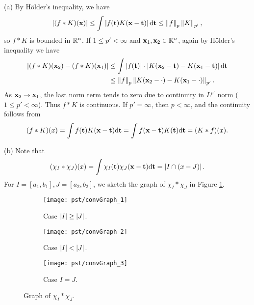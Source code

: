 \begin{exercise}{9.3}
  (a) By H\"{o}lder's inequality, we have
  \[
    \left| (f*K)(\mathbf{x}) \right|
    \le \int \left| f(\mathbf{t}) K(\mathbf{x} - \mathbf{t}) \right| \mathrm{d} \mathbf{t}
    \le \left\| f \right\|_p \left\| K \right\|_{p'},
  \]
  so $f*K$ is bounded in $\mathbb{R}^n$.
  If $1\le p' < \infty$ and $\mathbf{x}_1, \mathbf{x}_2 \in \mathbb{R}^n$,
  again by H\"{o}lder's inequality we have
  \[
    \begin{aligned}
      \left| (f*K)(\mathbf{x}_2) - (f*K)(\mathbf{x}_1) \right|
      &\le \int \left| f(\mathbf{t}) \right| \cdot
      \left| K(\mathbf{x}_2 - \mathbf{t}) - K(\mathbf{x}_1 - \mathbf{t})\right|
      \mathrm{d} \mathbf{t} \\
      &\le \left\| f \right\|_p
      \left\| K(\mathbf{x}_2 - \cdot) - K(\mathbf{x}_1 - \cdot) \right\|_{p'}.
    \end{aligned}
  \]
  As $\mathbf{x}_2 \rightarrow \mathbf{x}_1$,
  the last norm term tends to zero
  due to continuity in $L^{p'}$ norm ($1 \le p' < \infty$).
  Thus  $f*K$ is continuous.
  If $p' = \infty$, then $p < \infty$,
  and the continuity follows from
  \[
    (f*K)(x) = \int f(\mathbf{t}) K(\mathbf{x} - \mathbf{t}) \mathrm{d} \mathbf{t}
    = \int f(\mathbf{x} - \mathbf{t}) K(\mathbf{t}) \mathrm{d} \mathbf{t}
    = (K*f)(x).
  \]

  (b) Note that
  \[
    (\chi_I * \chi_J) (x) = \int \chi_I(\mathbf{t}) \chi_J(\mathbf{x}-\mathbf{t}) \mathrm{d} \mathbf{t}
    = \left\vert I \cap (x-J)\right\vert.
  \]
  For $I = [a_1, b_1], J = [a_2, b_2]$,
  we sketch the graph of $\chi_I * \chi_J$ in Figure \ref{fig:graphOfChiIChiJ}.
  \begin{figure}[htbp]
    \centering
    \begin{subfigure}[b]{.4\linewidth}
      \texttt{[image: pst/convGraph\_1]}
      \caption{Case $\left\vert I\right\vert \ge \left\vert J\right\vert$. }
    \end{subfigure}
    \begin{subfigure}[b]{.4\linewidth}
      \texttt{[image: pst/convGraph\_2]}
      \caption{Case $\left\vert I\right\vert < \left\vert J\right\vert$. }
    \end{subfigure}%

    \begin{subfigure}[b]{.4\linewidth}
      \texttt{[image: pst/convGraph\_3]}
      \caption{Case $I = J$. }
    \end{subfigure}%
    \caption{Graph of $\chi_I * \chi_J$. }
    \label{fig:graphOfChiIChiJ}
  \end{figure}
\end{exercise}
